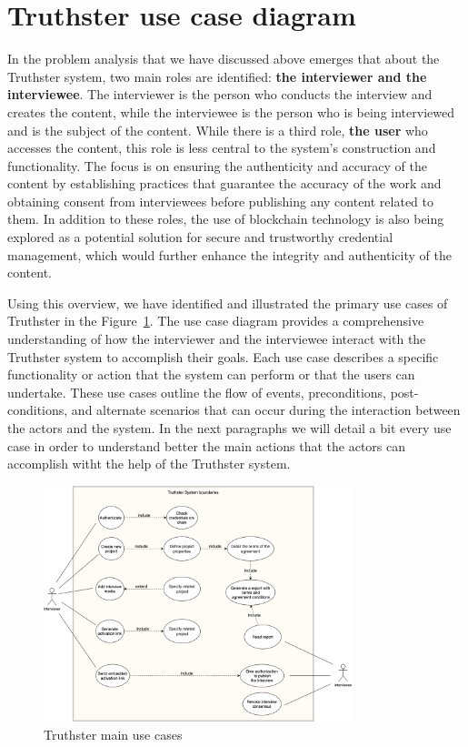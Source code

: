 \documentclass[target=mst,aauheader=]{thud}
\begin{document}
\section{Truthster use case diagram}

In the problem analysis that we have discussed above emerges that about the Truthster system, two main roles are identified: \textbf{the interviewer and the interviewee}. The interviewer is the person who conducts the interview and creates the content, while the interviewee is the person who is being interviewed and is the subject of the content.
While there is a third role, \textbf{the user} who accesses the content, this role is less central to the system's construction and functionality. The focus is on ensuring the authenticity and accuracy of the content by establishing practices that guarantee the accuracy of the work and obtaining consent from interviewees before publishing any content related to them.
In addition to these roles, the use of blockchain technology is also being explored as a potential solution for secure and trustworthy credential management, which would further enhance the integrity and authenticity of the content.

Using this overview, we have identified and illustrated the primary use cases of Truthster in the Figure~\ref{fig:useCaseDiagram}.
The use case diagram provides a comprehensive understanding of how the interviewer and the interviewee interact with the Truthster system to accomplish their goals. Each use case describes a specific functionality or action that the system can perform or that the users can undertake. These use cases outline the flow of events, preconditions, post-conditions, and alternate scenarios that can occur during the interaction between the actors and the system. In the next paragraphs we will detail a bit every use case in order to understand better the main actions that the actors can accomplish witht the help of the Truthster system.

\begin{figure}
    \centering
    \includegraphics[width=0.8\textwidth]{images/truthster_use_cases.png}
    \caption{Truthster main use cases}
    \label{fig:useCaseDiagram}
\end{figure}
\end{document}

